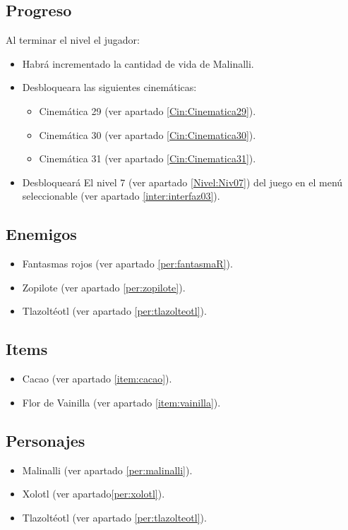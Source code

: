 	\subsection{Progreso}
	 Al terminar el nivel el jugador:
\begin{itemize}
        \item Habrá incrementado la cantidad de vida de Malinalli. 
        \item Desbloqueara las siguientes cinemáticas:
\begin{itemize}
        \item Cinemática 29 (ver apartado \ref{Cin:Cinematica29}). 
        \item Cinemática 30 (ver apartado \ref{Cin:Cinematica30}).
        \item Cinemática 31 (ver apartado \ref{Cin:Cinematica31}).
\end{itemize}
        \item Desbloqueará El nivel 7 (ver apartado  \ref{Nivel:Niv07}) del juego en el menú seleccionable (ver apartado \ref{inter:interfaz03}).
\end{itemize}
	\subsection{Enemigos}
	\begin{itemize}
		\item Fantasmas rojos (ver apartado \ref{per:fantasmaR}).
		\item Zopilote	(ver apartado \ref{per:zopilote}).
		\item Tlazoltéotl (ver apartado \ref{per:tlazolteotl}).
	\end{itemize}
	\subsection{Items}
\begin{itemize}
        \item   Cacao (ver apartado \ref{item:cacao}).
        \item Flor de Vainilla (ver apartado \ref{item:vainilla}).
\end{itemize}
	\subsection{Personajes}
	\begin{itemize}
		\item Malinalli (ver apartado \ref{per:malinalli}).
			
		\item Xolotl (ver apartado\ref{per:xolotl}).
		
		\item Tlazoltéotl (ver apartado \ref{per:tlazolteotl}).
			
	\end{itemize}
